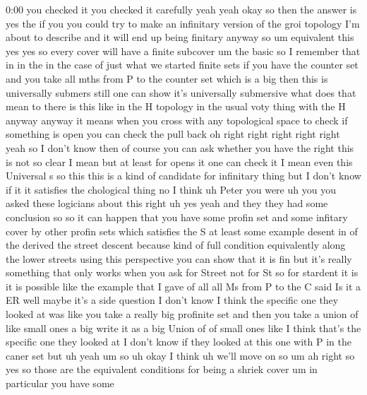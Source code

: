 \begin{unfinished}{0:00}
you  checked  it  you  checked  it
carefully  yeah  yeah  okay  so  then  the
answer  is  yes  the  if  you  you  could  try
to  make  an  infinitary  version  of  the
groi  topology  I'm  about  to  describe  and
it  will  end  up  being  finitary  anyway  so
um  equivalent  this  yes  yes  so  every
cover  will  have  a
finite
subcover
um  the
basic  so  I  remember  that  in  in  the  in
the  case  of  just  what  we  started  finite
sets  if  you  have  the  counter  set  and  you
take  all  mths  from  P  to  the  counter  set
which  is  a
big  then  this  is  universally  submers
still  one  can  show  it's  universally
submersive  what  does  that  mean  to  there
is  this  like  in  the  H  topology  in  the
usual  voty  thing  with  the  H  anyway
anyway  it  means  when  you  cross  with  any
topological  space  to  check  if  something
is  open  you  can  check  the  pull  back  oh
right  right  right  right  right  yeah  so  I
don't  know  then  of  course  you  can  ask
whether  you  have
the  right  this  is  not  so  clear  I  mean
but  at  least  for  opens  it  one  can  check
it  I  mean  even  this  Universal  s  so  this
this  is  a  kind  of  candidate  for
infinitary  thing  but  I  don't  know  if  it
it  satisfies  the  chological  thing  no  I
think  uh  Peter  you  were  uh  you  you  asked
these  logicians  about  this
right  uh  yes  yeah  and  they  they  had  some
conclusion  so  so  it  can  happen  that  you
have  some  profin  set  and  some  infitary
cover  by  other  profin  sets  which
satisfies  the
S  at  least  some  example
desent  in  of  the
derived  the  street  descent  because  kind
of  full  condition  equivalently  along  the
lower
streets  using  this  perspective  you  can
show  that  it  is  fin  but  it's  really
something  that  only  works  when  you  ask
for  Street  not  for  St  so  for  stardent  it
is  it  is  possible  like  the  example  that
I  gave  of  all  all  Ms  from  P  to  the  C
said  Is  it  a
ER  well  maybe  it's  a  side  question  I
don't  know  I  think  the  specific  one  they
looked  at  was  like  you  take  a  really  big
profinite  set  and  then  you  take  a  union
of  like  small  ones  a  big  write  it  as  a
big  Union  of  of  small  ones  like  I  think
that's  the  specific  one  they  looked  at  I
don't  know  if  they  looked  at  this  one
with  P  in  the  caner
set  but  uh
yeah
um  so  uh  okay  I  think  uh  we'll  move  on
so
um  ah  right  so  yes  so  those  are  the
equivalent  conditions  for  being  a  shriek
cover  um  in  particular  you  have  some

\end{unfinished}
